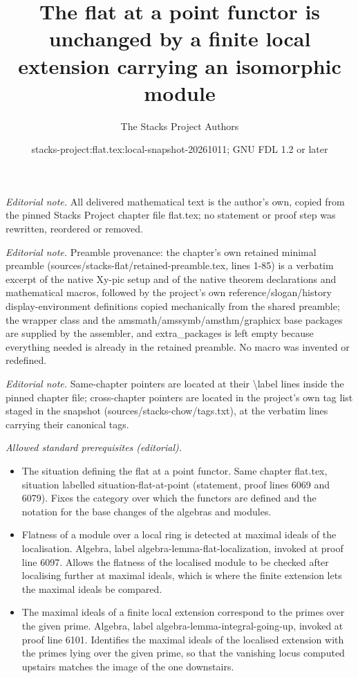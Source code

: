 \documentclass[10pt,a4paper]{amsart}
\title{The flat at a point functor is unchanged by a finite local extension carrying an isomorphic module}
\author{The Stacks Project Authors}
\date{stacks-project:flat.tex:local-snapshot-20261011; GNU FDL 1.2 or later}
\theoremstyle{plain}
\theoremstyle{definition}
\theoremstyle{remark}
\numberwithin{equation}{subsection}
\begin{document}
\maketitle
\noindent\textit{Editorial note.} All delivered mathematical text is the author's own, copied from the pinned Stacks Project chapter file flat.tex; no statement or proof step was rewritten, reordered or removed.\par\medskip
\noindent\textit{Editorial note.} Preamble provenance: the chapter's own retained minimal preamble (sources/stacks-flat/retained-preamble.tex, lines 1-85) is a verbatim excerpt of the native Xy-pic setup and of the native theorem declarations and mathematical macros, followed by the project's own reference/slogan/history display-environment definitions copied mechanically from the shared preamble; the wrapper class and the amsmath/amssymb/amsthm/graphicx base packages are supplied by the assembler, and extra\_packages is left empty because everything needed is already in the retained preamble. No macro was invented or redefined.\par\medskip
\noindent\textit{Editorial note.} Same-chapter pointers are located at their \textbackslash{}label lines inside the pinned chapter file; cross-chapter pointers are located in the project's own tag list staged in the snapshot (sources/stacks-chow/tags.txt), at the verbatim lines carrying their canonical tags.\par\medskip
\noindent\textit{Allowed standard prerequisites (editorial).}\begin{itemize}
\item The situation defining the flat at a point functor. Same chapter flat.tex, situation labelled situation-flat-at-point (statement, proof lines 6069 and 6079). Fixes the category over which the functors are defined and the notation for the base changes of the algebras and modules.
\item Flatness of a module over a local ring is detected at maximal ideals of the localisation. Algebra, label algebra-lemma-flat-localization, invoked at proof line 6097. Allows the flatness of the localised module to be checked after localising further at maximal ideals, which is where the finite extension lets the maximal ideals be compared.
\item The maximal ideals of a finite local extension correspond to the primes over the given prime. Algebra, label algebra-lemma-integral-going-up, invoked at proof line 6101. Identifies the maximal ideals of the localised extension with the primes lying over the given prime, so that the vanishing locus computed upstairs matches the image of the one downstairs.
\end{itemize}\medskip
\end{document}
